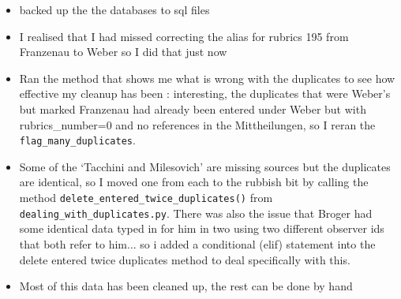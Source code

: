 \documentclass[12pt]{article}
\begin{document}
\begin{itemize}
    \item backed up the the databases to sql files
    \item I realised that I had missed correcting the alias for rubrics 195 from Franzenau to Weber so I did that just now
    \item Ran the method that shows me what is wrong with the duplicates to see how effective my cleanup has been : interesting, the duplicates that were Weber's but marked Franzenau had already been entered under Weber but with rubrics\_number=0 and no references in the Mittheilungen, so I reran the \texttt{flag\_many\_duplicates}.
    \item Some of the `Tacchini and Milesovich' are missing sources but the duplicates are identical, so I moved one from each to the rubbish bit by calling the method \texttt{delete\_entered\_twice\_duplicates()} from \texttt{dealing\_with\_duplicates.py}. There was also the issue that Broger had some identical data typed in for him in two using two different observer ids that both refer to him... so i added a conditional (elif) statement into the delete entered twice duplicates method to deal specifically with this.
    \item Most of this data has been cleaned up, the rest can be done by hand
\end{itemize}
    
\end{document}
